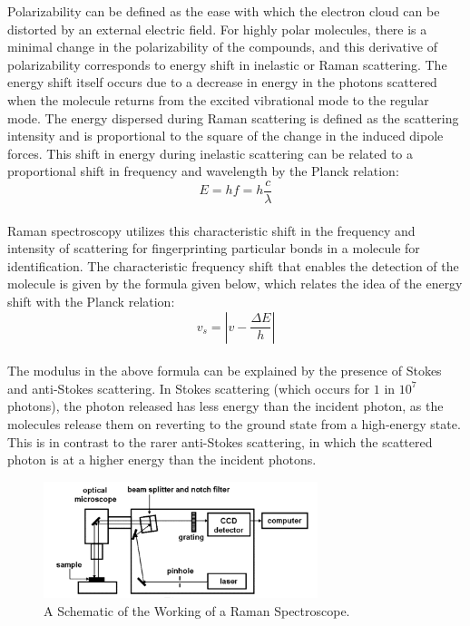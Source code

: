 \noindent Polarizability can be defined as the ease with which the electron cloud can be distorted by an external electric field. For highly polar molecules, there is a minimal change in the polarizability of the compounds, and this derivative of polarizability corresponds to energy shift in inelastic or Raman scattering. The energy shift itself occurs due to a decrease in energy in the photons scattered when the molecule returns from the excited vibrational mode to the regular mode. The energy dispersed during Raman scattering is defined as the scattering intensity and is proportional to the square of the change in the induced dipole forces. \cite{TracesLab_RamanUnderstanding}  This shift in energy during inelastic scattering can be related to a proportional shift in frequency and wavelength by the Planck relation: \cite{EnergyWaveTheory_Ehf} \\

$$
E = hf = h\frac{c}{\lambda} 
$$ \\
\noindent Raman spectroscopy utilizes this characteristic shift in the frequency and intensity of scattering for fingerprinting particular bonds in a molecule for identification. The characteristic frequency shift that enables the detection of the molecule is given by the formula given below, which relates the idea of the energy shift with the Planck relation: \cite{Berciu_Phys502_Raman} \\
$$
v_s = |v - \frac{\Delta E}{h}| 
$$ \\
\noindent The modulus in the above formula can be explained by the presence of Stokes and anti-Stokes scattering. In Stokes scattering (which occurs for $1$ in $10^7$ photons), the photon released has less energy than the incident photon, as the molecules release them on reverting to the ground state from a high-energy state. This is in contrast to the rarer anti-Stokes scattering, in which the scattered photon is at a higher energy than the incident photons. \cite{DoITPoMS_StokesStokes} \\

\begin{figure}[h!]
    \centering
    \includegraphics[width=8cm]{Figures/Raman_Schematic.png}
    \caption{A Schematic of the Working of a Raman Spectroscope. \cite{phdthesis} }
    \label{fig:raman}
\end{figure}


